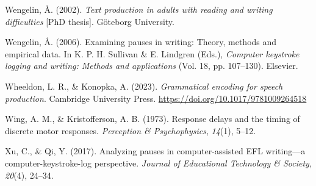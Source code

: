 \documentclass[
  man,floatsintext]{apa7}
\newlength{\cslhangindent}
\newlength{\cslentryspacingunit} %
\newenvironment{CSLReferences}[2] %
 {%
  \setlength{\parindent}{0pt}
  \ifodd #1
  \let\oldpar\par
  \def\par{\hangindent=\cslhangindent\oldpar}
  \fi
  \setlength{\parskip}{#2\cslentryspacingunit}
 }%
 {}
\begin{document}
\begin{CSLReferences}{1}{0}
\leavevmode{}%
Wengelin, Å. (2002). \emph{Text production in adults with reading and writing difficulties} {[}PhD thesis{]}. Göteborg University.

\leavevmode{}%
Wengelin, Å. (2006). Examining pauses in writing: {T}heory, methods and empirical data. In K. P. H. Sullivan \& E. Lindgren (Eds.), \emph{Computer keystroke logging and writing: Methods and applications} (Vol. 18, pp. 107--130). Elsevier.

\leavevmode{}%
Wheeldon, L. R., \& Konopka, A. (2023). \emph{Grammatical encoding for speech production}. Cambridge University Press. \url{https://doi.org/10.1017/9781009264518}

\leavevmode{}%
Wing, A. M., \& Kristofferson, A. B. (1973). Response delays and the timing of discrete motor responses. \emph{Perception \& Psychophysics}, \emph{14}(1), 5--12.

\leavevmode{}%
Xu, C., \& Qi, Y. (2017). Analyzing pauses in computer-assisted EFL writing---a computer-keystroke-log perspective. \emph{Journal of Educational Technology \& Society}, \emph{20}(4), 24--34.

\end{CSLReferences}
\end{document}
